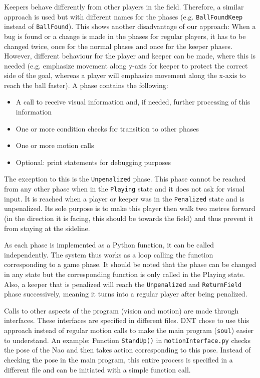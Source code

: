 \documentclass[a4paper]{article}
\begin{document}
Keepers behave differently from other players in the field. Therefore, a similar approach is used but with different names for the phases (e.g. \texttt{BallFoundKeep} instead of \texttt{BallFound}). This shows another disadvantage of our approach: When a bug is found or a change is made in the phases for regular players, it has to be changed twice, once for the normal phases and once for the keeper phases. However, different behaviour for the player and keeper can be made, where this is needed (e.g. emphasize movement along y-axis for keeper to protect the correct side of the goal, whereas a player will emphasize movement along the x-axis to reach the ball faster). A phase contains the following: 
\begin{itemize}
\item A call to receive visual information and, if needed, further processing of this information
\item One or more condition checks for transition to other phases
\item One or more motion calls
\item Optional: print statements for debugging purposes
\end{itemize}
The exception to this is the \texttt{Unpenalized} phase. This phase cannot be reached from any other phase when in the \texttt{Playing} state and it does not ask for visual input. It is reached when a player or keeper was in the \texttt{Penalized} state and is unpenalized. Its sole purpose is to make this player then walk two metres forward (in the direction it is facing, this should be towards the field) and thus prevent it from staying at the sideline. 

As each phase is implemented as a Python function, it can be called independently. The system thus works as a loop calling the function corresponding to a game phase. It should be noted that the phase can be changed in any state but the corresponding function is only called in the Playing state. Also, a keeper that is penalized will reach the \texttt{Unpenalized} and \texttt{ReturnField} phase successively, meaning it turns into a regular player after being penalized.  

Calls to other aspects of the program (vision and motion) are made through interfaces. These interfaces are specified in different files. DNT chose to use this approach instead of regular motion calls to make the main program (\texttt{soul}) easier to understand. An example: Function \texttt{StandUp()} in \texttt{motionInterface.py} checks the pose of the Nao and then takes action corresponding to this pose. Instead of checking the pose in the main program, this entire process is specified in a different file and can be initiated with a simple function call. 
\end{document}
